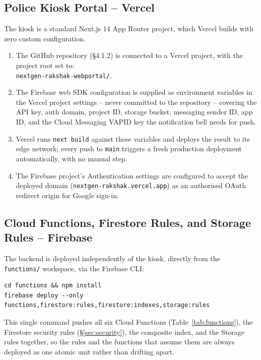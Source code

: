 \documentclass[12pt,a4paper,oneside]{report}
\newcommand{\code}[1]{\texttt{#1}}
\begin{document}
\subsection{Police Kiosk Portal -- Vercel}

The kiosk is a standard Next.js 14 App Router project, which Vercel builds
with zero custom configuration.

\begin{enumerate}
  \item The GitHub repository (\S4.1.2) is connected to a Vercel project,
        with the project root set to: \\
        \texttt{nextgen-rakshak-webportal/}.
  \item The Firebase web SDK configuration is supplied as environment
        variables in the Vercel project settings -- never committed to the
        repository -- covering the API key, auth domain, project ID,
        storage bucket, messaging sender ID, app ID, and the Cloud
        Messaging VAPID key the notification bell needs for push.
  \item Vercel runs \code{next build} against these variables and deploys
        the result to its edge network; every push to \code{main} triggers
        a fresh production deployment automatically, with no manual step.
  \item The Firebase project's Authentication settings are configured to
        accept the deployed domain (\texttt{nextgen-rakshak.vercel.app}) as
        an authorised OAuth redirect origin for Google sign-in.
\end{enumerate}

\subsection{Cloud Functions, Firestore Rules, and Storage Rules -- Firebase}

The backend is deployed independently of the kiosk, directly from the
\texttt{functions/} workspace, via the Firebase CLI:

\begin{lstlisting}[caption={Backend deployment command}]
cd functions && npm install
firebase deploy --only functions,firestore:rules,firestore:indexes,storage:rules
\end{lstlisting}

This single command pushes all six Cloud Functions (Table~\ref{tab:functions}),
the Firestore security rules (\S\ref{sec:security}), the composite index, and the Storage
rules together, so the rules and the functions that assume them are always
deployed as one atomic unit rather than drifting apart.
\end{document}
